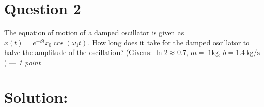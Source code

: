 \section*{Question 2}
The equation of motion of a damped oscillator is given as $x(t)=e^{-\beta t}x_0\cos{\left(\omega_1 t\right)}$. How long does it take for the damped oscillator to halve the amplitude of the oscillation? 
(Givens: $\ln2\approx 0.7$, $m=~1\text{kg}$, $b=1.4~\text{kg/s}$) --- \textit{1 point}

\section*{Solution:}
